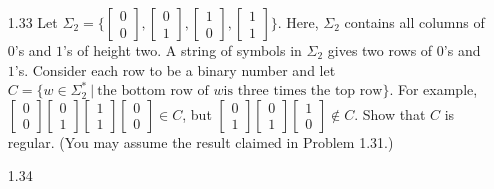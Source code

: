 \begin{enumerate}
    \item [1.33]
          Let $\Sigma_2 = \Biggl \{ \begin{bmatrix}0 \\0\end{bmatrix} , \begin{bmatrix}0 \\1\end{bmatrix} , \begin{bmatrix}1\\ 0\end{bmatrix}, \begin{bmatrix}1 \\1\end{bmatrix} \Biggl\}$. Here, $\Sigma_2$ contains all columns of $0$'s and $1$'s of height two. A string of symbols in $\Sigma_2$ gives two rows of $0$'s and $1$'s. Consider each row to be a binary number and let $C =\{w \in \Sigma^\ast_2~|~\text{the bottom row of }w \text{is three times the top row}\}$. For example, $\begin{bmatrix}0 \\0 \end{bmatrix}\begin{bmatrix}0\\ 1 \end{bmatrix}\begin{bmatrix}1 \\1 \end{bmatrix}\begin{bmatrix}0 \\0\end{bmatrix} \in C$, but $\begin{bmatrix}0 \\1\end{bmatrix} \begin{bmatrix}0\\ 1\end{bmatrix} \begin{bmatrix}1\\ 0\end{bmatrix} \notin C$. Show that $C$ is regular. (You may assume the result claimed in Problem 1.31.)

    \item [1.34]


\end{enumerate}
